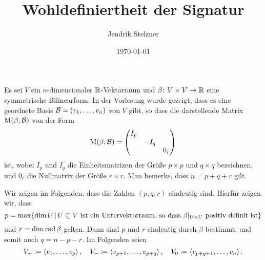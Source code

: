 \documentclass[a4paper, 10pt, numbers = noenddot]{scrartcl}
\title{Wohldefiniertheit der Signatur}
\author{Jendrik Stelzner}
\date{\today}
\begin{document}
\maketitle

Es sei $V$ ein $n$-dimensionaler $\mathbb{R}$-Vektorraum und $\beta \colon V \times V \to \mathbb{R}$ eine symmetrische Bilinearform.
In der Vorlesung wurde gezeigt, dass es eine geordnete Basis $\mathcal{B} = (v_1, \dotsc, v_n)$ von $V$ gibt, so dass die darstellende Matrix $\operatorname{M}(\beta, \mathcal{B})$ von der Form
\begin{equation}
  \label{equation: representing matrix is diagonal}
    \operatorname{M}(\beta, \mathcal{B})
  = \begin{pmatrix}
      I_p &       &     \\
          & -I_q  &     \\
          &       & 0_r
    \end{pmatrix}
\end{equation}
ist, wobei $I_p$ und $I_q$ die Einheitsmatrizen der Größe $p \times p$ und $q \times q$ bezeichnen, und $0_r$ die Nullmatrix der Größe $r \times r$.
Man bemerke, dass $n = p + q + r$ gilt.

Wir zeigen im Folgenden, dass die Zahlen $(p,q,r)$ eindeutig sind.
Hierfür zeigen wir, dass
\[
  p = \max  \{
              \dim U
            \,|\,
              \text{$U \subseteq V$ ist ein Untervektorraum, so dass $\beta|_{U \times U}$ positiv definit ist}
            \}
\]
und $r = \dim \operatorname{rad} \beta$ gelten.
Dann sind $p$ und $r$ eindeutig durch $\beta$ bestimmt, und somit auch $q = n - p - r$.
Im Folgenden seien
\[
  V_+ \coloneqq \left\langle  v_1, \dotsc, v_p  \right\rangle,
  \quad
  V_- \coloneqq \left\langle  v_{p+1}, \dotsc, v_{p+q}  \right\rangle,
  \quad
  V_0 \coloneqq \left\langle  v_{p+q+1}, \dotsc, v_n  \right\rangle.
\]
\end{document}
